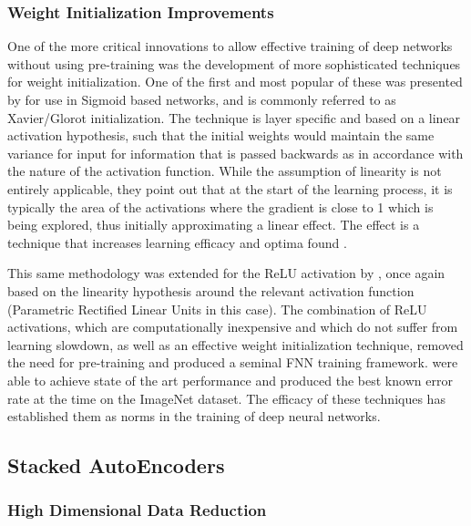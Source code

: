 \documentclass[a4paper,11pt,oneside]{article}
\theoremstyle{plain}
\theoremstyle{definition}
\begin{document}
	\subsubsection{Weight Initialization Improvements}\label{lr_weight_init}
	
	One of the more critical innovations to allow effective training of deep networks without using pre-training was the development of more sophisticated techniques for weight initialization. One of the first and most popular of these was presented by \citet{Glorot} for use in Sigmoid based networks, 
	and is commonly referred to as Xavier/Glorot initialization. The technique is layer specific and based on a linear activation
	hypothesis, such that the initial weights would maintain the same variance for input for information that is passed backwards as in 
	accordance with the nature of the activation function. While the assumption of linearity is not entirely applicable, they point out that at the 
	start of the learning process, it is typically the area of the activations where the gradient is close to 1 which is being explored, thus initially approximating 
	a linear effect. The effect is a technique that increases learning efficacy and optima found \citep{Glorot}. \newline
	
	This same methodology was extended for the ReLU activation by \citet{He}, once again based on the linearity hypothesis around the 
	relevant activation function (Parametric Rectified Linear Units in this case). The combination of ReLU activations, which are computationally inexpensive and which do not suffer from learning slowdown, as well as an effective weight initialization technique, removed the need for pre-training and produced a seminal FNN training framework. \citet{He} were able to 
	achieve state of the art performance and produced the best known error rate at the time on the ImageNet dataset. The efficacy of these techniques has established 
	them as norms in the training of deep neural networks.
	
	
	\subsection{Stacked AutoEncoders}\label{lr_SAE}
	
	\subsubsection{High Dimensional Data Reduction}\label{HDDR}
	
\end{document}
